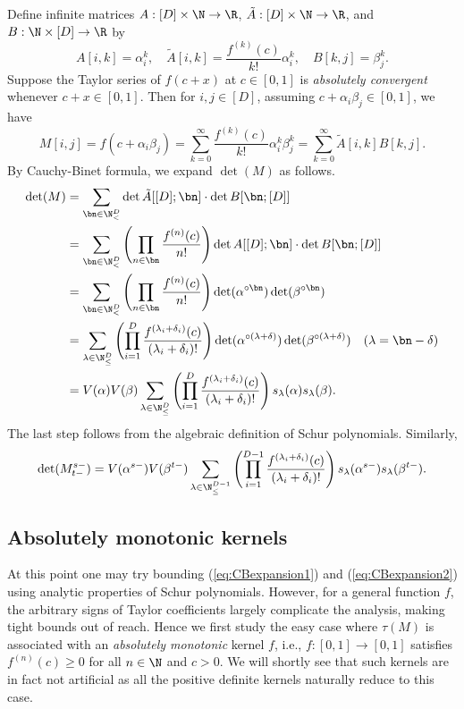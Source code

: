 Define infinite matrices $A: [D] \times \N \rightarrow \R$,
$\tilde A: [D] \times \N \rightarrow \R$, and $B: \N \times [D] \rightarrow \R$ by
\[A[i, k] = \alpha_i^k, \quad
\tilde A[i, k] = \frac{f^{(k)}(c)}{k!}\alpha_i^k, \quad B[k, j] = \beta_j^k.\]
Suppose the Taylor series of $f(c + x)$ at $c \in [0, 1]$ is \emph{absolutely convergent} whenever $c + x \in [0, 1]$. Then for $i, j \in [D]$, assuming $c + \alpha_i \beta_j \in [0, 1]$, we have
\[M[i, j] = f(c + \alpha_i\beta_j)
= \sum_{k=0}^{\infty} \frac{f^{(k)}(c)}{k!}\alpha_i^k \beta_j^k
=\sum_{k=0}^{\infty}\tilde A[i, k]B[k, j].\]
By Cauchy-Binet formula, we expand $\det(M)$ as follows.
\begin{align}
\det(M) &= \sum_{\bn \in \N^D_<} \det \tilde A[[D]; \bn] \cdot \det B[\bn; [D]] \notag\\
&=\sum_{\bn \in \N^D_<} \left(\prod_{n\in \bn} \frac{f^{(n)}(c)}{n!}\right)
\det A[[D]; \bn] \cdot \det B[\bn; [D]]  \notag\\
&=\sum_{\bn \in \N^D_<} \left(\prod_{n\in \bn} \frac{f^{(n)}(c)}{n!}\right)
\det (\alpha^{\circ \bn})\det (\beta^{\circ \bn}) \notag\\
&=\sum_{\lambda \in \N^D_{\le}}
\left(\prod_{i=1}^D \frac{f^{(\lambda_i + \delta_i)}(c)}{(\lambda_i + \delta_i)!}\right)
\det (\alpha^{\circ (\lambda + \delta)})\det (\beta^{\circ (\lambda + \delta)})
\quad (\lambda = \bn - \delta) \notag\\
&=V(\alpha)V(\beta) \sum_{\lambda \in \N^D_{\le}}
\left(\prod_{i=1}^D \frac{f^{(\lambda_i + \delta_i)}(c)}{(\lambda_i + \delta_i)!}\right)
s_{\lambda}(\alpha)s_{\lambda}(\beta). \label{eq:CBexpansion1} 
\end{align}
The last step follows from the algebraic definition of Schur polynomials. Similarly,
\begin{equation}
\det(M_{t-}^{s-}) = V(\alpha^{s-})V(\beta^{t-}) \sum_{\lambda \in \N^{D-1}_{\le}}
\left(\prod_{i=1}^{D-1} \frac{f^{(\lambda_i + \delta_i)}(c)}{(\lambda_i + \delta_i)!}\right)
s_{\lambda}(\alpha^{s-})s_{\lambda}(\beta^{t-}). \label{eq:CBexpansion2}
\end{equation}

\subsection{Absolutely monotonic kernels}
At this point one may try bounding (\ref{eq:CBexpansion1}) and (\ref{eq:CBexpansion2}) using analytic properties of Schur polynomials. However, for a general function $f$, the arbitrary signs of Taylor coefficients largely complicate the analysis, making tight bounds out of reach.
Hence we first study the easy case where $\tau(M)$ is associated with an \emph{absolutely monotonic} kernel $f$, i.e., $f:[0, 1]\rightarrow [0, 1]$ satisfies $f^{(n)}(c) \ge 0$ for all $n \in \N$ and $c > 0$. We will shortly see that such kernels are in fact not artificial as all the positive definite kernels naturally reduce to this case.

